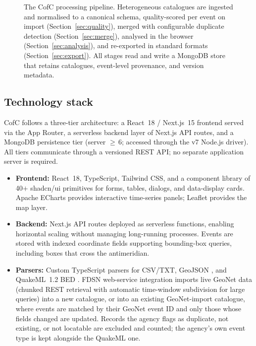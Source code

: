 \documentclass[12pt]{article}
\begin{document}
\begin{figure}[ht]
\caption{The CofC processing pipeline.  Heterogeneous catalogues are ingested
and normalised to a canonical schema, quality-scored per event on import
(Section~\ref{sec:quality}), merged with configurable duplicate detection
(Section~\ref{sec:merge}), analysed in the browser
(Section~\ref{sec:analysis}), and re-exported in standard formats
(Section~\ref{sec:export}).  All stages read and write a MongoDB store that
retains catalogues, event-level provenance, and version metadata.}
\label{fig:workflow}
\end{figure}

\subsection{Technology stack}

CofC follows a three-tier architecture: a React~18 / Next.js~15
\citep{nextjs2024} frontend served via the App Router, a serverless backend
layer of Next.js API routes, and a MongoDB \citep{mongodb2024} persistence
tier (server $\geq$\,6; accessed through the v7 Node.js driver).  All tiers communicate through a versioned REST API; no separate
application server is required.

\begin{itemize}[leftmargin=*]
  \item \textbf{Frontend:} React~18, TypeScript, Tailwind CSS, and a
    component library of 40$+$ shadcn/ui primitives for forms, tables,
    dialogs, and data-display cards.  Apache ECharts \citep{echarts2024}
    provides interactive time-series panels; Leaflet \citep{leaflet2024}
    provides the map layer.
  \item \textbf{Backend:} Next.js API routes deployed as serverless
    functions, enabling horizontal scaling without managing long-running
    processes.  Events are stored with indexed coordinate fields supporting
    bounding-box queries, including boxes that cross the antimeridian.
  \item \textbf{Parsers:} Custom TypeScript parsers for CSV/TXT, GeoJSON
    \citep{geojson2016}, and QuakeML~1.2 BED \citep{schorlemmer2011}.
    FDSN web-service integration imports live GeoNet data (chunked REST
    retrieval with automatic time-window subdivision for large queries) into a
    new catalogue, or into an existing GeoNet-import catalogue, where events are
    matched by their GeoNet event ID and only those whose fields changed are
    updated.  Records the agency flags as duplicate, not existing, or not
    locatable are excluded and counted; the agency's own event type is kept
    alongside the QuakeML one.
\end{itemize}
\end{document}
